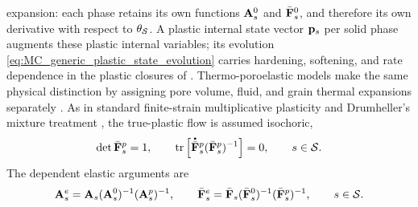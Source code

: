 expansion: each phase retains its own functions \(\mathbf{A}_s^0\) and
\(\bar{\mathbf{F}}_s^0\), and therefore its own derivative with respect to
\(\theta_{\mathcal{S}}\).
A plastic internal state vector \(\mathbf{p}_s\) per solid phase augments these
plastic internal variables; its evolution
\eqref{eq:MC_generic_plastic_state_evolution} carries hardening, softening,
and rate dependence in the plastic closures of .
Thermo-poroelastic models make the same physical distinction by assigning pore
volume, fluid, and grain thermal expansions separately
\cite{palciauskas1982thermally,ghabezloo2009stress,ghabezloo2011micromechanics}.
As in standard finite-strain multiplicative plasticity
\cite{simo1988framework,simo1998} and Drumheller's mixture treatment
\cite{drumheller2000}, the true-plastic flow is assumed isochoric,
%
\begin{equation}
	\det\bar{\mbf F}_s^p=1,
	\qquad
	\operatorname{tr}\left[
		\phasedot{\bar{\mbf F}}_s^p
		(\bar{\mbf F}_s^p)^{-1}
		\right]=0,
	\qquad
	s\in\mc S .
	\label{eq:MC_solid_isochoric_plastic_flow}
\end{equation}
%
The dependent elastic arguments are
%
\begin{equation}
	\mathbf{A}_s^e
	=
	\mathbf{A}_s
	(\mathbf{A}_s^0)^{-1}
	(\mathbf{A}_s^p)^{-1},
	\qquad
	\bar{\mathbf{F}}_s^e
	=
	\bar{\mathbf{F}}_s
	(\bar{\mathbf{F}}_s^0)^{-1}
	(\bar{\mathbf{F}}_s^p)^{-1},
	\qquad
	s\in\mathcal{S} .
	\label{eq:MC_solid_elastic_arguments}
\end{equation}
%

